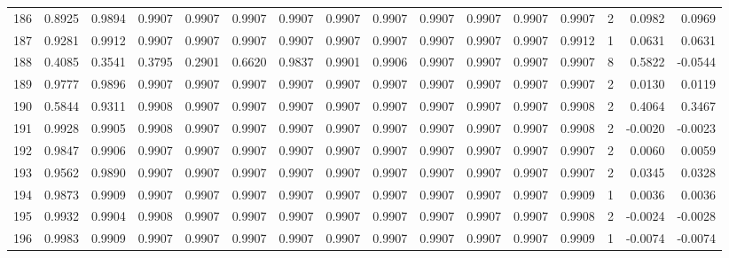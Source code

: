 \begin{tabular}{lrrrrrrrrrrrrrrr}
186 &      0.8925 &  0.9894 &  0.9907 &  0.9907 &  0.9907 &  0.9907 &  0.9907 &  0.9907 &  0.9907 &  0.9907 &   0.9907 &     0.9907 &      2 &                    0.0982 &                     0.0969 \\
187 &      0.9281 &  0.9912 &  0.9907 &  0.9907 &  0.9907 &  0.9907 &  0.9907 &  0.9907 &  0.9907 &  0.9907 &   0.9907 &     0.9912 &      1 &                    0.0631 &                     0.0631 \\
188 &      0.4085 &  0.3541 &  0.3795 &  0.2901 &  0.6620 &  0.9837 &  0.9901 &  0.9906 &  0.9907 &  0.9907 &   0.9907 &     0.9907 &      8 &                    0.5822 &                    -0.0544 \\
189 &      0.9777 &  0.9896 &  0.9907 &  0.9907 &  0.9907 &  0.9907 &  0.9907 &  0.9907 &  0.9907 &  0.9907 &   0.9907 &     0.9907 &      2 &                    0.0130 &                     0.0119 \\
190 &      0.5844 &  0.9311 &  0.9908 &  0.9907 &  0.9907 &  0.9907 &  0.9907 &  0.9907 &  0.9907 &  0.9907 &   0.9907 &     0.9908 &      2 &                    0.4064 &                     0.3467 \\
191 &      0.9928 &  0.9905 &  0.9908 &  0.9907 &  0.9907 &  0.9907 &  0.9907 &  0.9907 &  0.9907 &  0.9907 &   0.9907 &     0.9908 &      2 &                   -0.0020 &                    -0.0023 \\
192 &      0.9847 &  0.9906 &  0.9907 &  0.9907 &  0.9907 &  0.9907 &  0.9907 &  0.9907 &  0.9907 &  0.9907 &   0.9907 &     0.9907 &      2 &                    0.0060 &                     0.0059 \\
193 &      0.9562 &  0.9890 &  0.9907 &  0.9907 &  0.9907 &  0.9907 &  0.9907 &  0.9907 &  0.9907 &  0.9907 &   0.9907 &     0.9907 &      2 &                    0.0345 &                     0.0328 \\
194 &      0.9873 &  0.9909 &  0.9907 &  0.9907 &  0.9907 &  0.9907 &  0.9907 &  0.9907 &  0.9907 &  0.9907 &   0.9907 &     0.9909 &      1 &                    0.0036 &                     0.0036 \\
195 &      0.9932 &  0.9904 &  0.9908 &  0.9907 &  0.9907 &  0.9907 &  0.9907 &  0.9907 &  0.9907 &  0.9907 &   0.9907 &     0.9908 &      2 &                   -0.0024 &                    -0.0028 \\
196 &      0.9983 &  0.9909 &  0.9907 &  0.9907 &  0.9907 &  0.9907 &  0.9907 &  0.9907 &  0.9907 &  0.9907 &   0.9907 &     0.9909 &      1 &                   -0.0074 &                    -0.0074 \\

\end{tabular}

